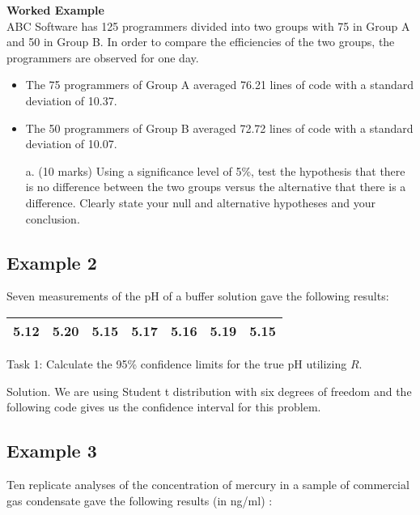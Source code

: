 \item \textbf{Worked Example} \\ ABC Software has 125 programmers divided into two groups with 75 in
Group A and 50 in Group B. In order to compare the efficiencies of the
two groups, the programmers are observed for one day. \begin{itemize} \item The 75
programmers of Group A averaged 76.21 lines of code with a standard
deviation of 10.37. \item The 50 programmers of Group B averaged 72.72
lines of code with a standard deviation of 10.07. \end{itemize}
\begin{itemize}
\item[a.](10 marks) Using a significance
level of 5\%, test the hypothesis that there is no difference between the
two groups versus the alternative that there is a difference. Clearly state
your null and alternative hypotheses and your conclusion.
\end{itemize}



\subsection{Example 2}

Seven measurements of the pH of a buffer solution gave the
following results:

\begin{center}
\begin{tabular}{|c|c|c|c|c|c|c|}
\hline
5.12 & 5.20 & 5.15 & 5.17 & 5.16 & 5.19 & 5.15\\
\hline
\end{tabular}
\end{center}


Task 1: Calculate the 95\% confidence limits for the true pH
utilizing $R$.


Solution. We are using Student t distribution with six degrees of
freedom and the following code gives us the confidence interval
for this problem.

\subsection{Example 3} Ten replicate analyses of the concentration
of mercury in a sample of commercial gas condensate gave the
following results (in ng/ml) :

